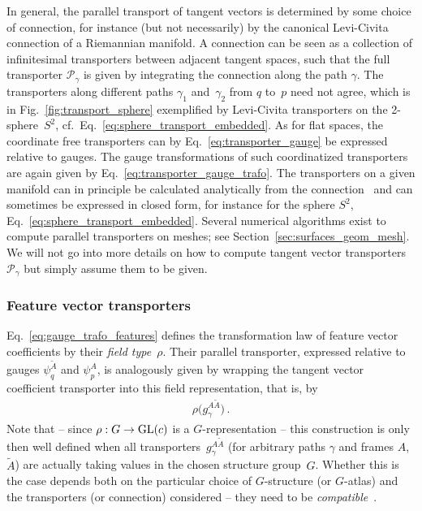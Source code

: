 In general, the parallel transport of tangent vectors is determined by some choice of connection, for instance (but not necessarily) by the canonical Levi-Civita connection of a Riemannian manifold.
A connection can be seen as a collection of infinitesimal transporters between adjacent tangent spaces, such that the full transporter $\mathcal{P}_\gamma$ is given by integrating the connection along the path $\gamma$.
The transporters along different paths $\gamma_1$ and~$\gamma_2$ from $q$ to~$p$ need not agree, which is in Fig.~\ref{fig:transport_sphere} exemplified by Levi-Civita transporters on the 2-sphere~$S^2$, cf.~Eq.~\eqref{eq:sphere_transport_embedded}.
As for flat spaces, the coordinate free transporters can by Eq.~\eqref{eq:transporter_gauge} be expressed relative to gauges.
The gauge transformations of such coordinatized transporters are again given by Eq.~\eqref{eq:transporter_gauge_trafo}.
The transporters on a given manifold can in principle be calculated analytically from the connection~\cite{gallier2019diffgeom1,nakahara2003geometry} and can sometimes be expressed in closed form, for instance for the sphere $S^2$, Eq.~\eqref{eq:sphere_transport_embedded}.
Several numerical algorithms exist to compute parallel transporters on meshes; see Section~\ref{sec:surfaces_geom_mesh}.
We will not go into more details on how to compute tangent vector transporters $\mathcal{P}_\gamma$ but simply assume them to be given.




\subsubsection{Feature vector transporters}

Eq.~\eqref{eq:gauge_trafo_features} defines the transformation law of feature vector coefficients by their \emph{field type}~$\rho$.
Their parallel transporter, expressed relative to gauges $\psi_q^{\widetilde{A}}$ and $\psi_p^A$, is analogously given by wrapping the tangent vector coefficient transporter into this field representation, that is, by
\begin{align}
    \rho\big( g_\gamma^{A\widetilde{A}} \big) \,.
\end{align}
Note that -- since $\rho:G\to\operatorname{GL}(c)$ is a $G$-representation -- this construction is only then well defined when all transporters~$g_\gamma^{A\widetilde{A}}$ (for arbitrary paths $\gamma$ and frames $A$, $\widetilde{A}$) are actually taking values in the chosen structure group~$G$.
Whether this is the case depends both on the particular choice of $G$-structure (or $G$-atlas) and the transporters (or connection) considered -- they need to be \emph{compatible}~\cite{wendlLectureNotesBundles2008}.


